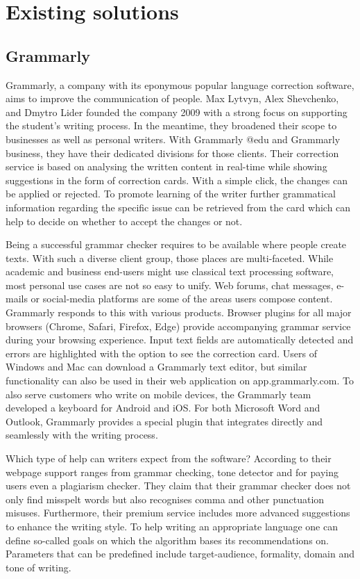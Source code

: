 \documentclass[runningheads]{llncs}
\begin{document}
\section{Existing solutions}
\subsection{Grammarly}
Grammarly, a company with its eponymous popular language correction software, aims to improve the communication of people. Max Lytvyn, Alex Shevchenko, and Dmytro Lider founded the company 2009 with a strong focus on supporting the student's writing process. In the meantime, they broadened their scope to businesses as well as personal writers. With Grammarly @edu and Grammarly business, they have their dedicated divisions for those clients. Their correction service is based on analysing the written content in real-time while showing suggestions in the form of correction cards.  With a simple click, the changes can be applied or rejected. To promote learning of the writer further grammatical information regarding the specific issue can be retrieved from the card which can help to decide on whether to accept the changes or not. \citep{noauthor_write_nodate}

Being a successful grammar checker requires to be available where people create texts. With such a diverse client group, those places are multi-faceted. While academic and business end-users might use classical text processing software, most personal use cases are not so easy to unify. Web forums, chat messages, e-mails or social-media platforms are some of the areas users compose content. Grammarly responds to this with various products. Browser plugins for all major browsers (Chrome, Safari, Firefox, Edge) provide accompanying grammar service during your browsing experience. Input text fields are automatically detected and errors are highlighted with the option to see the correction card. Users of Windows and Mac can download a Grammarly text editor, but similar functionality can also be used in their web application on app.grammarly.com. To also serve customers who write on mobile devices, the Grammarly team developed a keyboard for Android and iOS. For both Microsoft Word and Outlook, Grammarly provides a special plugin that integrates directly and seamlessly with the writing process.

Which type of help can writers expect from the software? According to their webpage \parencite{noauthor_write_nodate} support ranges from grammar checking, tone detector and for paying users even a plagiarism checker. They claim that their grammar checker does not only find misspelt words but also recognises comma and other punctuation misuses. Furthermore, their premium service includes more advanced suggestions to enhance the writing style. To help writing an appropriate language one can define so-called goals on which the algorithm bases its recommendations on. Parameters that can be predefined include target-audience, formality, domain and tone of writing.   
\end{document}
